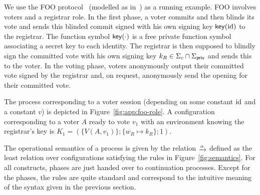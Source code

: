 \begin{example}
  \label{ex:app:process}
We use the FOO protocol~\cite{fujioka1992practical}
(modelled as in~\cite{vote-CSF16})
 as a running example.
FOO involves voters and a registrar role.
In the first phase, a voter commits and then blinds its vote and
sends this blinded commit signed with his own signing key $\mathsf{key}(\mathrm{id})$
to the registrar.
The function symbol $\mathsf{key}(\cdot)$ is a free
private function symbol associating a secret key to each identity.
The registrar is then supposed to blindly sign the committed vote
with his own signing key $k_R\in\Sigma_c\cap\Sigma_{\mathsf{priv}}$ and sends
this to the voter.
In the voting phase, voters anonymously output their committed
vote signed by the registrar and, on request, anonymously send
the opening for their committed vote.

The process corresponding to a voter session
(depending on some constant
$\mathrm{id}$ and a constant $v$)
is depicted in Figure~\ref{fig:app:foo-role}.
A configuration corresponding to a voter $A$ ready to vote $v_1$
with an environment knowing the registrar's key is
$K_1=(\{V(A,v_1)\};\{w_R\mapsto k_R\};1)$.
\end{example}
The operational semantics of a process 
is given by the relation
$\lrstep{\alpha}$
defined as the least relation over configurations satisfying the rules
in Figure~\ref{fig:semantics}.
For all constructs, phases are just handed over to continuation processes.
Except for the phases, the rules are quite standard and correspond to the
intuitive meaning of the syntax given in the previous section. 

